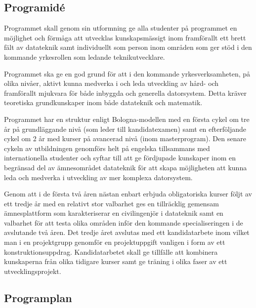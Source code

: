 \documentclass[twocolumn]{article}
\begin{document}
\subsection{Programidé}

Programmet skall genom sin utformning ge alla studenter på programmet
en möjlighet och förmåga att utvecklas kunskapsmässigt inom
framförallt ett brett fält av datateknik samt individuellt som person
inom områden som ger stöd i den kommande yrkesrollen som ledande
teknikutvecklare.

Programmet ska ge en god grund för att i den kommande
yrkesverksamheten, på olika nivåer, aktivt kunna medverka i och leda
utveckling av hård- och framförallt mjukvara för både inbyggda och
generella datorsystem. Detta kräver teoretiska grundkunskaper inom
både datateknik och matematik.

Programmet har en struktur enligt Bologna-modellen med en första cykel
om tre år på grundläggande nivå (som leder till kandidatexamen) samt
en efterföljande cykel om 2 år med kurser på avancerad nivå (inom
masterprogram). Den senare cykeln av utbildningen genomförs helt på
engelska tillsammans med internationella studenter och syftar till att
ge fördjupade kunskaper inom en begränsad del av ämnesområdet
datateknik för att skapa möjligheten att kunna leda och medverka i
utveckling av mer komplexa datorsystem.

Genom att i de första två åren nästan enbart erbjuda obligatoriska
kurser följt av ett tredje år med en relativt stor valbarhet ges en
tillräcklig gemensam ämnesplattform som karakteriserar en
civilingenjör i datateknik samt en valbarhet för att testa olika
områden inför den kommande specialiseringen i de avslutande två åren.
Det tredje året avslutas med ett kandidatarbete inom vilket man i en
projektgrupp genomför en projektuppgift vanligen i form av ett
konstruktionsuppdrag. Kandidatarbetet skall ge tillfälle att kombinera
kunskaperna från olika tidigare kurser samt ge träning i olika faser
av ett utvecklingsprojekt.

\subsection{Programplan}
\end{document}
